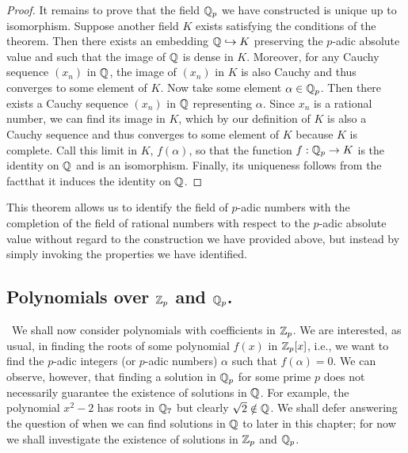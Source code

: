 \begin{proof}
    It remains to prove that the field \(\mathbb{Q}_p\) we have constructed is
    unique up to isomorphism. Suppose another field \(K\) exists satisfying the
    conditions of the theorem. Then there exists an embedding \(\mathbb{Q}
    \hookrightarrow K\) preserving the \(p\)-adic absolute value and such that
    the image of \(\mathbb{Q}\) is dense in \(K\). Moreover, for any Cauchy
    sequence \((x_n)\) in \(\mathbb{Q}\), the image of \((x_n)\) in \(K\) is
    also Cauchy and thus converges to some element of \(K\). Now take some
    element \(\alpha \in \mathbb{Q}_p\). Then there exists a Cauchy sequence
    \((x_n)\) in \(\mathbb{Q}\) representing \(\alpha\). Since \(x_n\) is a
    rational number, we can find its image in \(K\), which by our definition of
    \(K\) is also a Cauchy sequence and thus converges to some element of \(K\)
    because \(K\) is complete. Call this limit in \(K\), \(f(\alpha)\), so that
    the function \(f: \mathbb{Q}_p \to K\) is the identity on \(\mathbb{Q}\) and
    is an isomorphism. Finally, its uniqueness follows from the factthat it
    induces the identity on \(\mathbb{Q}\).
\end{proof}

This theorem allows us to identify the field of \(p\)-adic numbers with the
completion of the field of rational numbers with respect to the \(p\)-adic
absolute value without regard to the construction we have provided above, but
instead by simply invoking the properties we have identified.



\subsection{Polynomials over \(\mathbb{Z}_p\) and \(\mathbb{Q}_p\).}~We shall now
consider polynomials with coefficients in \(\mathbb{Z}_p\). We are interested, as
usual, in finding the roots of some polynomial \(f(x)\) in \(\mathbb{Z}_p[x]\),
i.e., we want to find the \(p\)-adic integers (or \(p\)-adic numbers) \(\alpha\)
such that \(f(\alpha) = 0\). We can observe, however, that finding a solution in
\(\mathbb{Q}_p\) for some prime \(p\) does not necessarily guarantee the
existence of solutions in \(\mathbb{Q}\). For example, the polynomial \(x^2 -
2\) has roots in \(\mathbb{Q}_7\) but clearly \(\sqrt{2} \notin \mathbb{Q}\). We
shall defer answering the question of when we can find solutions in
\(\mathbb{Q}\) to later in this chapter; for now we shall investigate the
existence of solutions in \(\mathbb{Z}_p\) and
\(\mathbb{Q}_p\).\label{sec:polynomials-over-zp}

